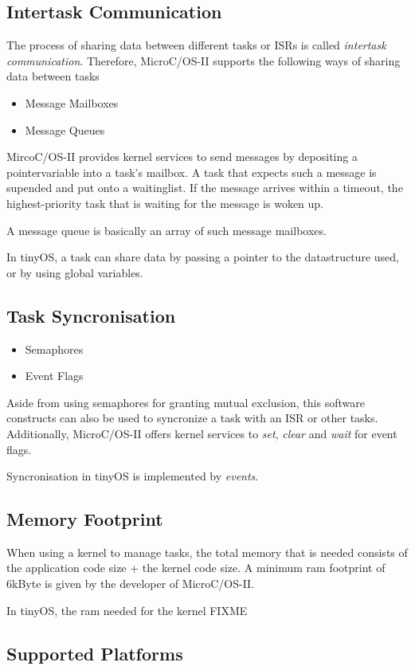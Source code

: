 \subsection{Intertask Communication}

The process of sharing data between different tasks or ISRs is called \textit{intertask communication}. Therefore, MicroC/OS-II supports the following ways of sharing data between tasks

\begin{itemize}
 \item Message Mailboxes
 \item Message Queues 
\end{itemize}

MircoC/OS-II provides kernel services to send messages by depositing a pointervariable into a task's mailbox. A task that expects such a message is supended and put onto a waitinglist. If the message arrives within a timeout, the highest-priority task that is waiting for the message is woken up.

A message queue is basically an array of such message mailboxes.

In tinyOS, a task can share data by passing a pointer to the datastructure used, or by using global variables.

\subsection{Task Syncronisation}

\begin{itemize}
 \item Semaphores 
 \item Event Flags
\end{itemize}

Aside from using semaphores for granting mutual exclusion, this software constructs can also be used to syncronize a task with an ISR or other tasks.
Additionally, MicroC/OS-II offers kernel services to \textit{set}, \textit{clear} and \textit{wait} for event flags.

Syncronisation in tinyOS is implemented by \textit{events}.

\subsection{Memory Footprint}

When using a kernel to manage tasks, the total memory that is needed consists of the application code size + the kernel code size. A minimum ram footprint of 6kByte is given by the developer of MicroC/OS-II.

In tinyOS, the ram needed for the kernel FIXME

\subsection{Supported Platforms}

